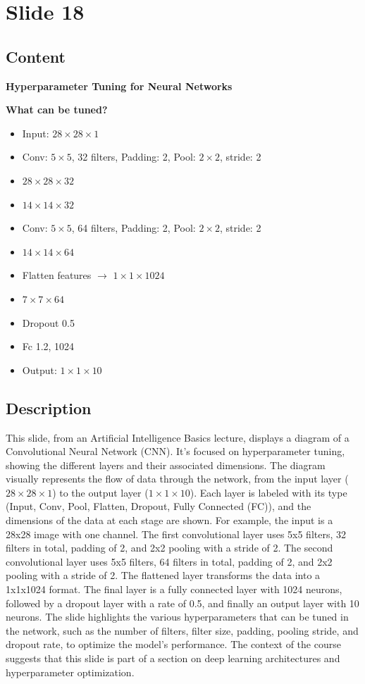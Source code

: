 \documentclass{article}%
\begin{document}
%
\newpage%
\section{Slide 18}%
\label{sec:Slide18}%
\subsection{Content}%

\textbf{Hyperparameter Tuning for Neural Networks}

\textbf{What can be tuned?}

\begin{itemize}
    \item Input: $28 \times 28 \times 1$
    \item Conv: $5 \times 5$, 32 filters, Padding: 2, Pool: $2 \times 2$, stride: 2
    \item $28 \times 28 \times 32$
    \item $14 \times 14 \times 32$
    \item Conv: $5 \times 5$, 64 filters, Padding: 2, Pool: $2 \times 2$, stride: 2
    \item $14 \times 14 \times 64$
    \item Flatten features $\rightarrow$ $1 \times 1 \times 1024$
    \item $7 \times 7 \times 64$
    \item Dropout 0.5
    \item Fc 1.2, 1024
    \item Output: $1 \times 1 \times 10$
\end{itemize}
%
\subsection{Description}%
This slide, from an Artificial Intelligence Basics lecture, displays a diagram of a Convolutional Neural Network (CNN).  It's focused on hyperparameter tuning, showing the different layers and their associated dimensions.  The diagram visually represents the flow of data through the network, from the input layer ($28 \times 28 \times 1$) to the output layer ($1 \times 1 \times 10$).  Each layer is labeled with its type (Input, Conv, Pool, Flatten, Dropout, Fully Connected (FC)), and the dimensions of the data at each stage are shown.  For example, the input is a 28x28 image with one channel.  The first convolutional layer uses 5x5 filters, 32 filters in total, padding of 2, and 2x2 pooling with a stride of 2.  The second convolutional layer uses 5x5 filters, 64 filters in total, padding of 2, and 2x2 pooling with a stride of 2.  The flattened layer transforms the data into a 1x1x1024 format.  The final layer is a fully connected layer with 1024 neurons, followed by a dropout layer with a rate of 0.5, and finally an output layer with 10 neurons.  The slide highlights the various hyperparameters that can be tuned in the network, such as the number of filters, filter size, padding, pooling stride, and dropout rate, to optimize the model's performance.  The context of the course suggests that this slide is part of a section on deep learning architectures and hyperparameter optimization.%
\end{document}
